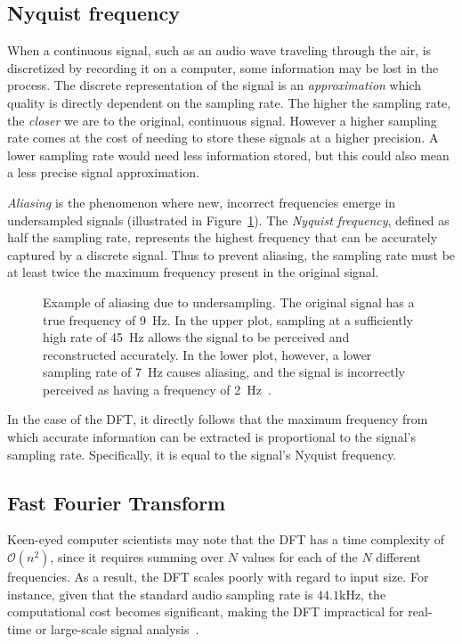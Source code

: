 \subsection{Nyquist frequency}

When a continuous signal, such as an audio wave traveling through the air, is discretized by recording it on a computer, some information may be lost in the process. The discrete representation of the signal is an \textit{approximation} which quality is directly dependent on the sampling rate. The higher the sampling rate, the \textit{closer} we are to the original, continuous signal. However a higher sampling rate comes at the cost of needing to store these signals at a higher precision. A lower sampling rate would need less information stored, but this could also mean a less precise signal approximation.

\textit{Aliasing} is the phenomenon where new, incorrect frequencies emerge in undersampled signals (illustrated in Figure~\ref{AliasingFigure}). The \textit{Nyquist frequency}, defined as half the sampling rate, represents the highest frequency that can be accurately captured by a discrete signal. Thus to prevent aliasing, the sampling rate must be at least twice the maximum frequency present in the original signal.

\begin{figure}[H]
    \centering
    
    \caption{Example of aliasing due to undersampling. The original signal has a true frequency of 9~Hz. In the upper plot, sampling at a sufficiently high rate of 45~Hz allows the signal to be perceived and reconstructed accurately. In the lower plot, however, a lower sampling rate of 7~Hz causes aliasing, and the signal is incorrectly perceived as having a frequency of 2~Hz~\cite{nationalinstruments_signal_processing_2012}.}
    \label{AliasingFigure}
\end{figure}

In the case of the \gls{DFT}, it directly follows that the maximum frequency from which accurate information can be extracted is proportional to the signal's sampling rate. Specifically, it is equal to the signal's Nyquist frequency.

\subsection{Fast Fourier Transform}

Keen-eyed computer scientists may note that the \gls{DFT} has a time complexity of $\mathcal{O}(n^2)$, since it requires summing over $N$ values for each of the $N$ different frequencies. As a result, the \gls{DFT} scales poorly with regard to input size. For instance, given that the standard audio sampling rate is $44.1 \text{kHz}$, the computational cost becomes significant, making the \gls{DFT} impractical for real-time or large-scale signal analysis~\cite{pras2010sampling}.

